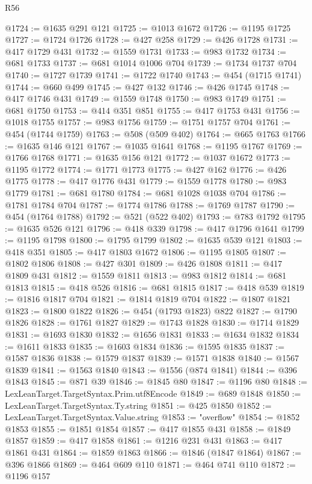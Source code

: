 \begin{lexlean}{R56}
\begin{coremodule}
@1724 := @1635 @291 @121
@1725 := @1013 @1672
@1726 := @1195 @1725
@1727 := @1724 @1726
@1728 := @427 @258
@1729 := @426 @1728
@1731 := @417 @1729 @431
@1732 := @1559 @1731
@1733 := @983 @1732
@1734 := @681 @1733
@1737 := @681 @1014 @1006 @704
@1739 := @1734 @1737 @704
@1740 := @1727 @1739
@1741 := @1722 @1740
@1743 := @454 (@1715 @1741)
@1744 := @660 @499
@1745 := @427 @132
@1746 := @426 @1745
@1748 := @417 @1746 @431
@1749 := @1559 @1748
@1750 := @983 @1749
@1751 := @681 @1750
@1753 := @414 @351 @851
@1755 := @417 @1753 @431
@1756 := @1018 @1755
@1757 := @983 @1756
@1759 := @1751 @1757 @704
@1761 := @454 (@1744 @1759)
@1763 := @508 (@509 @402)
@1764 := @665 @1763
@1766 := @1635 @146 @121
@1767 := @1035 @1641
@1768 := @1195 @1767
@1769 := @1766 @1768
@1771 := @1635 @156 @121
@1772 := @1037 @1672
@1773 := @1195 @1772
@1774 := @1771 @1773
@1775 := @427 @162
@1776 := @426 @1775
@1778 := @417 @1776 @431
@1779 := @1559 @1778
@1780 := @983 @1779
@1781 := @681 @1780
@1784 := @681 @1028 @1038 @704
@1786 := @1781 @1784 @704
@1787 := @1774 @1786
@1788 := @1769 @1787
@1790 := @454 (@1764 @1788)
@1792 := @521 (@522 @402)
@1793 := @783 @1792
@1795 := @1635 @526 @121
@1796 := @418 @339
@1798 := @417 @1796 @1641
@1799 := @1195 @1798
@1800 := @1795 @1799
@1802 := @1635 @539 @121
@1803 := @418 @351
@1805 := @417 @1803 @1672
@1806 := @1195 @1805
@1807 := @1802 @1806
@1808 := @427 @301
@1809 := @426 @1808
@1811 := @417 @1809 @431
@1812 := @1559 @1811
@1813 := @983 @1812
@1814 := @681 @1813
@1815 := @418 @526
@1816 := @681 @1815
@1817 := @418 @539
@1819 := @1816 @1817 @704
@1821 := @1814 @1819 @704
@1822 := @1807 @1821
@1823 := @1800 @1822
@1826 := @454 (@1793 @1823) @822
@1827 := @1790 @1826
@1828 := @1761 @1827
@1829 := @1743 @1828
@1830 := @1714 @1829
@1831 := @1693 @1830
@1832 := @1656 @1831
@1833 := @1634 @1832
@1834 := @1611 @1833
@1835 := @1603 @1834
@1836 := @1595 @1835
@1837 := @1587 @1836
@1838 := @1579 @1837
@1839 := @1571 @1838
@1840 := @1567 @1839
@1841 := @1563 @1840
@1843 := @1556 (@874 @1841)
@1844 := @396 @1843
@1845 := @871 @39
@1846 := @1845 @80
@1847 := @1196 @80
@1848 := LexLeanTarget.TargetSyntax.Prim.utf8Encode
@1849 := @689 @1848
@1850 := LexLeanTarget.TargetSyntax.Ty.string
@1851 := @425 @1850
@1852 := LexLeanTarget.TargetSyntax.Value.string
@1853 := "overflow"
@1854 := @1852 @1853
@1855 := @1851 @1854
@1857 := @417 @1855 @431
@1858 := @1849 @1857
@1859 := @417 @1858
@1861 := @1216 @231 @431
@1863 := @417 @1861 @431
@1864 := @1859 @1863
@1866 := @1846 (@1847 @1864)
@1867 := @396 @1866
@1869 := @464 @609 @110
@1871 := @464 @741 @110
@1872 := @1196 @157

\end{coremodule}
\end{lexlean}
